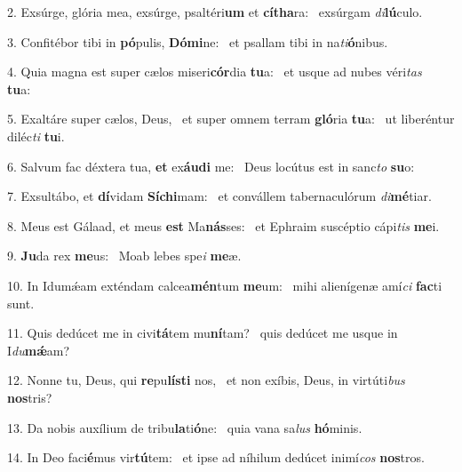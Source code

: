 2. Exsúrge, glória mea, exsúrge, psaltéri\textbf{um} et \textbf{cí}\textbf{tha}ra: \ast\  exsúrgam \textit{di}\textbf{lú}culo.\

3. Confitébor tibi in \textbf{pó}pulis, \textbf{Dó}\textbf{mi}ne: \ast\  et psallam tibi in na\textit{ti}\textbf{ó}nibus.\

4. Quia magna est super cælos miseri\textbf{cór}dia \textbf{tu}a: \ast\  et usque ad nubes véri\textit{tas} \textbf{tu}a:\

5. Exaltáre super cælos, Deus, \dag\  et super omnem terram \textbf{gló}ria \textbf{tu}a: \ast\  ut liberéntur diléc\textit{ti} \textbf{tu}i.\

6. Salvum fac déxtera tua, \textbf{et} ex\textbf{áu}\textbf{di} me: \ast\  Deus locútus est in sanc\textit{to} \textbf{su}o:\

7. Exsultábo, et \textbf{dí}vidam \textbf{Sí}\textbf{chi}mam: \ast\  et convállem tabernaculórum \textit{di}\textbf{mé}tiar.\

8. Meus est Gálaad, et meus \textbf{est} Ma\textbf{nás}ses: \ast\  et Ephraim suscéptio cápi\textit{tis} \textbf{me}i.\

9. \textbf{Ju}da rex \textbf{me}us: \ast\  Moab lebes spe\textit{i} \textbf{me}æ.\

10. In Idumǽam exténdam calcea\textbf{mén}tum \textbf{me}um: \ast\  mihi alienígenæ amí\textit{ci} \textbf{fac}ti sunt.\

11. Quis dedúcet me in civi\textbf{tá}tem mu\textbf{ní}tam? \ast\  quis dedúcet me usque in I\textit{du}\textbf{mǽ}am?\

12. Nonne tu, Deus, qui \textbf{re}pu\textbf{lís}\textbf{ti} nos, \ast\  et non exíbis, Deus, in virtúti\textit{bus} \textbf{nos}tris?\

13. Da nobis auxílium de tribu\textbf{la}ti\textbf{ó}ne: \ast\  quia vana sa\textit{lus} \textbf{hó}minis.\

14. In Deo faci\textbf{é}mus vir\textbf{tú}tem: \ast\  et ipse ad níhilum dedúcet inimí\textit{cos} \textbf{nos}tros.\


